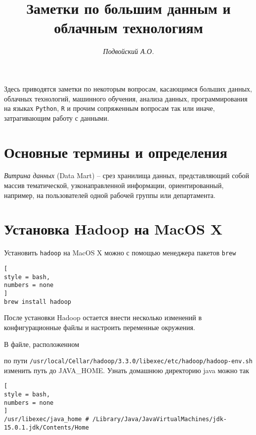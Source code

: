 \documentclass[%
	11pt,
	a4paper,
	utf8,
		]{article}
\begin{document}
\title{Заметки по большим данным и облачным технологиям}

\author{\itshape Подвойский А.О.}

\date{}
\maketitle

\thispagestyle{fancy}

Здесь приводятся заметки по некоторым вопросам, касающимся больших данных, облачных технологий, машинного обучения, анализа данных, программирования на языках \texttt{Python}, \texttt{R} и прочим сопряженным вопросам так или иначе, затрагивающим работу с данными.



\tableofcontents

\section{Основные термины и определения}

\noindent\emph{Витрина данных} (Data Mart) -- срез хранилища данных, представляющий собой массив тематической, узконаправленной информации, ориентированный, например, на пользователей одной рабочей группы или департамента.


\section{Установка Hadoop на MacOS X}

Установить \texttt{hadoop} на MacOS X можно с помощью менеджера пакетов \texttt{brew}
\begin{lstlisting}[
style = bash,
numbers = none	
]
brew install hadoop
\end{lstlisting}

После установки Hadoop остается внести несколько изменений в конфигурационные файлы и настроить переменные окружения.

В файле, расположенном

по пути \texttt{/usr/local/Cellar/hadoop/3.3.0/libexec/etc/hadoop/hadoop-env.sh} изменить путь до JAVA\_HOME. Узнать домашнюю директорию java можно так
\begin{lstlisting}[
style = bash,
numbers = none	
]
/usr/libexec/java_home # /Library/Java/JavaVirtualMachines/jdk-15.0.1.jdk/Contents/Home
\end{lstlisting}
\end{document}
